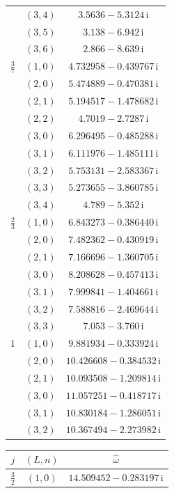 \begin{table}[H]
\begin{minipage}[t]{0.325\textwidth}
\begin{tabular}[t]{|c|c|c|}
 & $(3,4)$ & $3.5636-5.3124\,\mathrm{i}$ \\
 & $(3,5)$ & $3.138-6.942\,\mathrm{i}$ \\
 & $(3,6)$ & $2.866-8.639\,\mathrm{i}$ \\
\hline
$\tfrac37$ & $(1,0)$ & $4.732958-0.439767\,\mathrm{i}$ \\
 & $(2,0)$ & $5.474889-0.470381\,\mathrm{i}$ \\
 & $(2,1)$ & $5.194517-1.478682\,\mathrm{i}$ \\
 & $(2,2)$ & $4.7019-2.7287\,\mathrm{i}$ \\
 & $(3,0)$ & $6.296495-0.485288\,\mathrm{i}$ \\
 & $(3,1)$ & $6.111976-1.485111\,\mathrm{i}$ \\
 & $(3,2)$ & $5.753131-2.583367\,\mathrm{i}$ \\
 & $(3,3)$ & $5.273655-3.860785\,\mathrm{i}$ \\
 & $(3,4)$ & $4.789-5.352\,\mathrm{i}$ \\
\hline
$\tfrac23$ & $(1,0)$ & $6.843273-0.386440\,\mathrm{i}$ \\
 & $(2,0)$ & $7.482362-0.430919\,\mathrm{i}$ \\
 & $(2,1)$ & $7.166696-1.360705\,\mathrm{i}$ \\
 & $(3,0)$ & $8.208628-0.457413\,\mathrm{i}$ \\
 & $(3,1)$ & $7.999841-1.404661\,\mathrm{i}$ \\
 & $(3,2)$ & $7.588816-2.469644\,\mathrm{i}$ \\
 & $(3,3)$ & $7.053-3.760\,\mathrm{i}$ \\
\hline
$1$ & $(1,0)$ & $9.881934-0.333924\,\mathrm{i}$ \\
 & $(2,0)$ & $10.426608-0.384532\,\mathrm{i}$ \\
 & $(2,1)$ & $10.093508-1.209814\,\mathrm{i}$ \\
 & $(3,0)$ & $11.057251-0.418717\,\mathrm{i}$ \\
 & $(3,1)$ & $10.830184-1.286051\,\mathrm{i}$ \\
 & $(3,2)$ & $10.367494-2.273982\,\mathrm{i}$ \\
\hline
\end{tabular}
\end{minipage}\hfill
\begin{minipage}[t]{0.325\textwidth}
\centering
\begin{tabular}[t]{|c|c|c|}
\hline
$j$ & $(L,n)$ & $\widehat{\omega}$ \\
\hline
$\tfrac32$ & $(1,0)$ & $14.509452-0.283197\,\mathrm{i}$ \\

\end{tabular}
\end{minipage}
\end{table}

